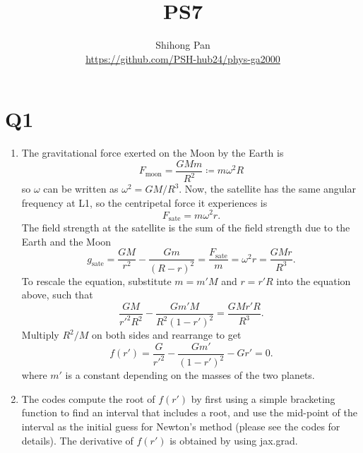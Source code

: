 \documentclass[11pt]{article}
\title{PS7}
\author{Shihong Pan\\ \url{https://github.com/PSH-hub24/phys-ga2000}}
\begin{document}
\maketitle

\section*{Q1}
\begin{enumerate}[label=(\alph*)]
    \item The gravitational force exerted on the Moon by the Earth is
    \begin{equation}
        F_{\text{moon}}=\frac{GMm}{R^2}\coloneqq m\omega^2R
    \end{equation}
    so $\omega$ can be written as $\omega^2=GM/R^3$. Now, the satellite has the same angular frequency at L1, so the centripetal force it experiences is
    \begin{equation}
        F_{\text{sate}}=m\omega^2r.
    \end{equation}
    The field strength at the satellite is the sum of the field strength due to the Earth and the Moon
    \begin{equation}
        g_{\text{sate}} = \frac{GM}{r^2}-\frac{Gm}{(R-r)^2}=\frac{F_{\text{sate}}}{m}=\omega^2r=\frac{GMr}{R^3}.
    \end{equation}
    To rescale the equation, substitute $m=m'M$ and $r=r'R$ into the equation above, such that
    \begin{equation}
        \frac{GM}{r'^2R^2}-\frac{Gm'M}{R^2(1-r')^2}=\frac{GMr'R}{R^3}.
    \end{equation}
    Multiply $R^2/M$ on both sides and rearrange to get
    \begin{equation}
        f(r')=\frac{G}{r'^2}-\frac{Gm'}{(1-r')^2}-Gr'=0.
    \end{equation}
    where $m'$ is a constant depending on the masses of the two planets. 
    
    \item The codes compute the root of $f(r')$ by first using a simple bracketing function to find an interval that includes a root, and use the mid-point of the interval as the initial guess for Newton's method (please see the codes for details). The derivative of $f(r')$ is obtained by using jax.grad.


\end{enumerate}
\end{document}
